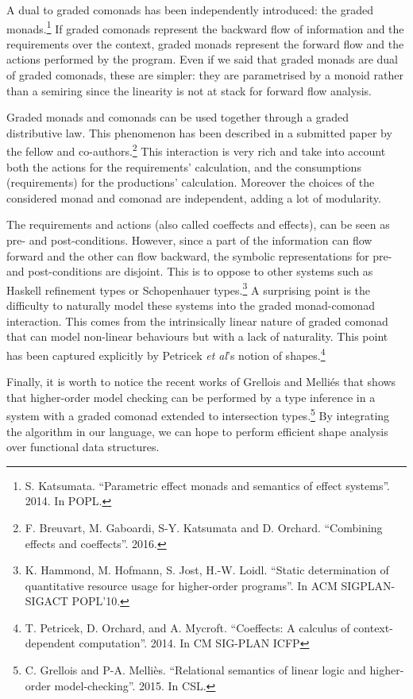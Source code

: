 \documentclass{article}[11pt]
\begin{document}
A dual to graded comonads has been independently introduced: the graded monads.\footnote{S. Katsumata. ``Parametric effect monads and semantics of effect systems''. 2014. In POPL.} If graded comonads represent the backward flow of information and the requirements over the context, graded monads represent the forward flow and the actions performed by the program. Even if we said that graded monads are dual of graded comonads, these are simpler: they are parametrised by a monoid rather than a semiring since the linearity is not at stack for forward flow analysis.

Graded monads and comonads can be used together through a graded distributive law. This phenomenon has been described in a submitted paper by the fellow and co-authors.\footnote{F. Breuvart, M. Gaboardi, S-Y. Katsumata and D. Orchard. ``Combining effects and coeffects''. 2016.} This interaction is very rich and take into account both the actions for the requirements' calculation, and the consumptions (requirements) for the productions' calculation. Moreover the choices of the considered monad and comonad are independent, adding a lot of modularity.

The requirements and actions (also called coeffects and effects), can be seen as pre- and post-conditions. However, since a part of the information can flow forward and the other can flow backward, the symbolic representations for pre- and post-conditions are disjoint. This is to oppose to other systems such as Haskell refinement types or Schopenhauer types.\footnote{K. Hammond, M. Hofmann, S. Jost, H.-W. Loidl. ``Static determination of quantitative resource usage for higher-order programs''. In ACM SIGPLAN-SIGACT POPL’10.} A surprising point is the difficulty to naturally model these systems into the graded monad-comonad interaction. This comes from the intrinsically linear nature of graded comonad that can model non-linear behaviours but with a lack of naturality. This point has been captured explicitly by Petricek {\em et al}'s notion of shapes.\footnote{T. Petricek, D. Orchard, and A. Mycroft. ``Coeffects: A calculus of context-dependent computation''. 2014. In CM SIG-PLAN ICFP}

Finally, it is worth to notice the recent works of Grellois and Melli\'es that shows that higher-order model checking can be performed by a type inference in a system with a graded comonad extended to intersection types.\footnote{C. Grellois and P-A. Melli\`es. ``Relational semantics of linear logic and higher-order model-checking''. 2015. In CSL.} By integrating the algorithm in our language, we can hope to perform efficient shape analysis over functional data structures.
\end{document}
